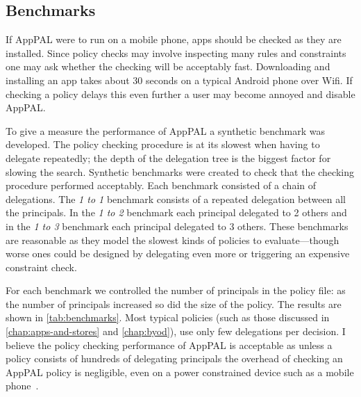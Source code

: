 \documentclass[thesis.tex]{subfiles}
\begin{document}
\subsection{Benchmarks}
\label{ssec:benchmarks}

If AppPAL were to run on a mobile phone, apps should be checked as they are installed.
Since policy checks may involve inspecting many rules and constraints one may ask whether the checking will be acceptably fast.
Downloading and installing an app takes about 30 seconds on a typical Android phone over Wifi.
If checking a policy delays this even further a user may become annoyed and disable AppPAL.

To give a measure the performance of AppPAL a synthetic benchmark was developed.
The policy checking procedure is at its slowest when having to delegate repeatedly;
the depth of the delegation tree is the biggest factor for slowing the search.
Synthetic benchmarks were created to check that the checking procedure performed acceptably.
Each benchmark consisted of a chain of delegations.
The \emph{1 to 1} benchmark consists of a repeated delegation between all the principals.
In the \emph{1 to 2} benchmark each principal delegated to 2 others and in the \emph{1 to 3} benchmark each principal delegated to 3 others.
These benchmarks are reasonable as they model the slowest kinds of policies to
evaluate---though worse ones could be designed by delegating even more or triggering an expensive constraint check.

For each benchmark we controlled the number of principals in the policy file:
as the number of principals increased so did the size of the policy.
The results are shown in \autoref{tab:benchmarks}.
Most typical policies (such as those discussed in \autoref{chap:apps-and-stores} and \autoref{chap:byod}), use only few delegations per decision.
I believe the policy checking performance of AppPAL is acceptable as unless a policy consists of hundreds of delegating principals the overhead of checking an AppPAL policy is negligible, even on a power constrained device such as a mobile phone~\cite{hallett_apppal_2016}.
\end{document}
